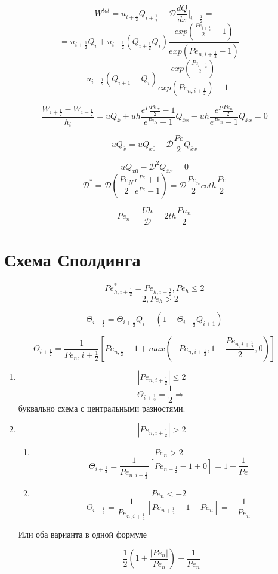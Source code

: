 \documentclass[14pt]{extarticle}
\begin{document}
\[ W^{tot} = u_{i+\frac{1}{2}} Q_{i+\frac{1}{2}} - \mathcal{D} \frac{dQ}{dx}|_{i+\frac{1}{2}} = \]
\[ = u_{i+\frac{1}{2}} Q_i + u_{i+\frac{1}{2}}(Q_{i+\frac{1}{2}} Q_i) \frac{exp(\frac{{Pe}_{i+\frac{1}{2}}}{2}-1)}{exp({Pe_{n, i+\frac{1}{2}}}-1)} - \]
\[ - u_{i+\frac{1}{2}}(Q_{i+1}-Q_i) \frac{exp(\frac{{Pe}_{i+\frac{1}{2}}}{2})}{exp({Pe_{n, i+\frac{1}{2}}})-1} \]

\[ \frac{W_{i+\frac{1}{2}} - W_{i-\frac{1}{2}}}{h_i} = u Q_{\overline{x}} + u h \frac{e^P \frac{{Pe}_N}{2}-1}{e^{{Pe}_N}-1} Q_{\overline{x}x} - u h \frac{e^P \frac{{Pe}_n}{2}}{e^{{Pe}_n}-1} Q_{\overline{x}x} = 0 \]

\[ u Q_{\overline{x}} = u Q_{x0} - \mathcal{D} \frac{Pe}{2} Q_{\overline{x}x} \]

\[ u Q_{x0} - \mathcal{D}^2 Q_{\overline{x}x} = 0 \]
\[ \mathcal{D}^* = \mathcal{D} (\frac{{Pe}_N}{2} \frac{e^{Pe} + 1}{e^{Pe}-1}) = \mathcal{D} \frac{{Pe}_n }{2} coth\frac{{Pe}}{2} \]

\[ {Pe}_n = \frac{Uh }{\mathcal{D }} = 2 th \frac{{Pn}_n}{2} \]

\section{Схема Сполдинга}

\[ {Pe}^*_{h, i+\frac{1}{2}} = Pe_{h, i+\frac{1}{2}}, {Pe}_h \leq 2 \]
\[ = 2, {Pe}_h > 2 \]

\[ \Theta_{i+\frac{1}{2}} = \Theta_{i+\frac{1}{2}} Q_i + (1 - \Theta_{i+\frac{1}{2}}Q_{i+1})\]

\[ \Theta_{i+\frac{1}{2}} = \frac{1}{{Pe_n, i+\frac{1}{2}}}[{Pe_{n, \frac{1}{2}}}-1+max(- {Pe}_{n, i+\frac{1}{2}}, 1-\frac{{Pe}_{n, i+\frac{1}{2}}}{2}, 0)] \]


\begin{enumerate}
	\item 
	\[ |Pe_{n, i+\frac{1}{2}}| \leq 2 \]
	\[ \Theta_{i+\frac{1}{2}} = \frac{1}{2} \Rightarrow \] буквально схема с центральными разностями.
	\item
	\[ |Pe_{n, i+\frac{1}{2}}| > 2 \]

	\begin{enumerate}
	\item 
	\[ {Pe}_n > 2 \]
	\[ \Theta_{i+\frac{1}{2}} = \frac{1}{{Pe}_{n, i+\frac{1}{2}}} [{Pe}_{n+\frac{1}{2}} -1 + 0] = 1 - \frac{1}{Pe} \]

	\item
	\[ Pe_{n} < -2 \]
	\[ \Theta_{i+\frac{1}{2}} = \frac{1}{{Pe}_{n, i+\frac{1}{2}}} [{Pe}_{n+\frac{1}{2}} -1 - {Pe}_n] = - \frac{1}{{Pe}_{n}} \]

	\end{enumerate}
	Или оба варианта в одной формуле

	\[ \frac{1}{2}(1+ \frac{|{Pe}_n|}{{Pe}_n}) - \frac{1}{{Pe}_n} \]

\end{enumerate}
\end{document}
